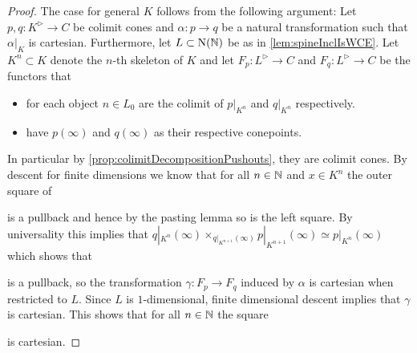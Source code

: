 \begin{lemma}
\begin{proof}
        The case for general $K$ follows from the following argument:
        Let $p,q\colon K^{\rhd}\to C$  be colimit cones and $\alpha\colon p\to q$ be a natural transformation such that $\alpha|_K$ is cartesian.
        Furthermore, let $L\subset\operatorname{N}(\mathbb{N})$ be as in \cref{lem:spineInclIsWCE}.
        Let $K^n\subset K$ denote the $n$-th skeleton of $K$ and let $F_p\colon L^{\rhd}\to C$ and $F_q\colon L^{\rhd}\to C$ be the functors that 
        \begin{itemize}
            \item for each object $n\in L_0$ are the colimit of $p|_{K^n}$ and $q|_{K^n}$ respectively.
            \item have $p(\infty)$ and $q(\infty)$ as their respective conepoints.
        \end{itemize}
        In particular by \cref{prop:colimitDecompositionPushouts}, they are colimit cones.
        By descent for finite dimensions we know that for all $n\in\mathbb{N}$ and $x\in K^n$ the outer square of
        \begin{center}
        \end{center}
        is a pullback and hence by the pasting lemma so is the left square.
        By universality this implies that $q|_{K^n}(\infty)\times_{q|_{K^{n+1}}(\infty)}p|_{K^{n+1}}(\infty)\simeq p|_{K^n}(\infty)$ which shows that
        \begin{center}
        \end{center}
        is a pullback, so the transformation $\gamma\colon F_p\to F_q$ induced by $\alpha$ is cartesian when restricted to $L$.
        Since $L$ is $1$-dimensional, finite dimensional descent implies that $\gamma$ is cartesian.
        This shows that for all $n\in\mathbb{N}$ the square
        \begin{center}
        \end{center}
        is cartesian.


\end{proof}
\end{lemma}
